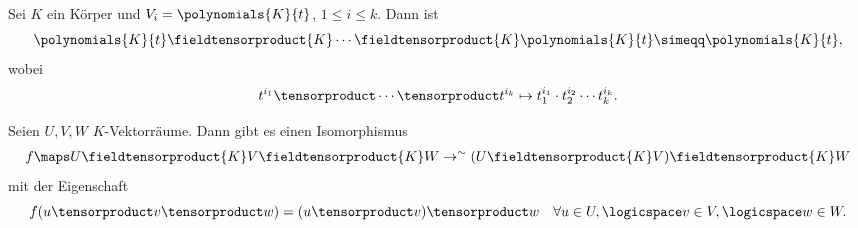 \begin{beispiel*}
  Sei \( K \) ein Körper und \( V_i=\polynomials{K}{t} \), \( 1\leq i\leq  k\). Dann ist 
  \begin{equation*}
    \polynomials{K}{t}\fieldtensorproduct{K}\dotsb\fieldtensorproduct{K}\polynomials{K}{t}\simeqq \polynomials{K}{t},
  \end{equation*}
  wobei
  \begin{equation*}
    t^{i_1}\tensorproduct \dotsb\tensorproduct t^{i_k}\mapsto t_1^{i_1}\cdot t_2^{i_2}\dotsm t_k^{i_k}.
  \end{equation*}
\end{beispiel*}
\begin{lemma}\label{multidimensionales_tensorprodukt_isomorphismen}
  Seien \( U,V,W \) \( K \)-Vektorräume. Dann gibt es einen Isomorphismus
  \begin{equation}
    \begin{split}
      f\maps U\fieldtensorproduct{K} V\fieldtensorproduct{K}W\to^{\sim}(U\fieldtensorproduct{K}V)\fieldtensorproduct{K}W
    \end{split}
  \end{equation}
  mit der Eigenschaft
  \begin{equation*}
    f(u\tensorproduct v\tensorproduct w)=(u\tensorproduct v)\tensorproduct w\quad \forall u\in U,\logicspace v\in V,\logicspace w\in W.
  \end{equation*}
\end{lemma}
